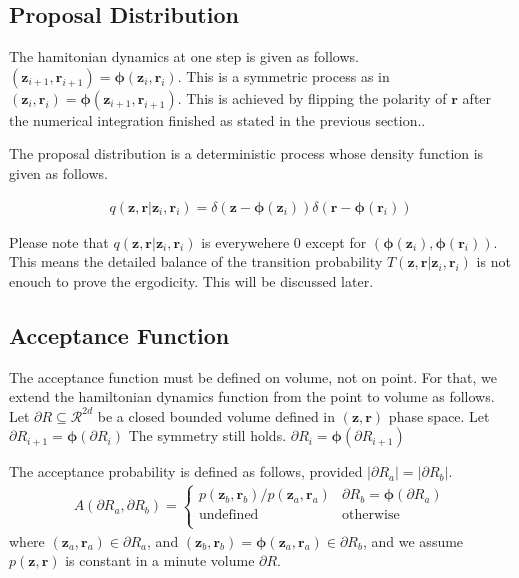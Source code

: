 \documentclass[a4]{article}
\begin{document}
\subsection{Proposal Distribution}

The hamitonian dynamics at one step is given as follows.
$(\bm{z}_{i+1}, \bm{r}_{i+1})= \bm{\phi}(\bm{z}_{i}, \bm{r}_{i})$.
This is a symmetric process as in
$(\bm{z}_{i}, \bm{r}_{i})= \bm{\phi}(\bm{z}_{i+1}, \bm{r}_{i+1})$.
This is achieved by flipping the polarity of $\bm{r}$ after the numerical integration finished as stated in the previous section..

The proposal distribution is a deterministic process whose density function is given as follows.

\begin{equation}
\begin{aligned}
q(\bm{z}, \bm{r}|\bm{z}_i, \bm{r}_i) = 
\delta\left(\bm{z} - \bm{\phi}(\bm{z}_i)\right)\delta\left(\bm{r} - \bm{\phi}(\bm{r}_i)\right)
\end{aligned}
\end{equation}

Please note that $q(\bm{z}, \bm{r}|\bm{z}_i, \bm{r}_i)$ is everywehere 0 except for 
$(\bm{\phi}(\bm{z}_i), \bm{\phi}(\bm{r}_i))$. This means the detailed balance of the transition
probability $T(\bm{z},\bm{r}|\bm{z}_i, \bm{r}_i)$ is not enouch to prove the ergodicity.
This will be discussed later.

\subsection{Acceptance Function}
The acceptance function must be defined on volume, not on point.
For that, we extend the hamiltonian dynamics function from the point to volume as follows.
Let ${\partial}R \subseteq \mathcal{R}^{2d}$ be a closed bounded volume
defined in $(\bm{z},\bm{r})$ phase space.
Let ${\partial}R_{i+1}= \bm{\phi}({\partial}R_{i})$
The symmetry still holds.
${\partial}R_{i} = \bm{\phi}({\partial}R_{i+1})$

The acceptance probability is defined as follows, provided $|{\partial}R_a| = |{\partial}R_b|$.
\begin{equation}
\begin{aligned}
A({\partial}R_a, {\partial}R_b) = 
    \begin{cases}
        {p(\bm{z}_b, \bm{r}_b)}/{p(\bm{z}_a, \bm{r}_a)} & {\partial}R_b = \bm{\phi}({\partial}R_a)\\
        \text{undefined} & \text{otherwise}\\
    \end{cases}\label{eq:hmc_acceptance}
\end{aligned}
\end{equation}
where $(\bm{z}_a, \bm{r}_a) \in {\partial}R_a$, and
$(\bm{z}_b, \bm{r}_b) = \bm{\phi}(\bm{z}_a, \bm{r}_a) \in {\partial}R_b$,
and we assume $p(\bm{z}, \bm{r})$ is constant in a minute volume ${\partial}R$.
\end{document}

